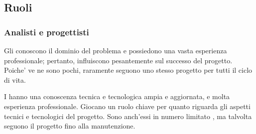 \subsection{Ruoli}

\subsubsection{Analisti e progettisti}
Gli  conoscono il dominio del problema e possiedono una vasta esperienza professionale; pertanto, influiscono pesantemente sul successo del progetto. Poiche' ve ne sono pochi, raramente seguono uno stesso progetto per tutti il ciclo di vita. 

I  hanno una conoscenza tecnica e tecnologica ampia e aggiornata, e molta esperienza professionale. Giocano un ruolo chiave per quanto riguarda gli aspetti tecnici e tecnologici del progetto. Sono anch'essi in numero limitato , ma talvolta seguono il progetto fino alla manutenzione.

